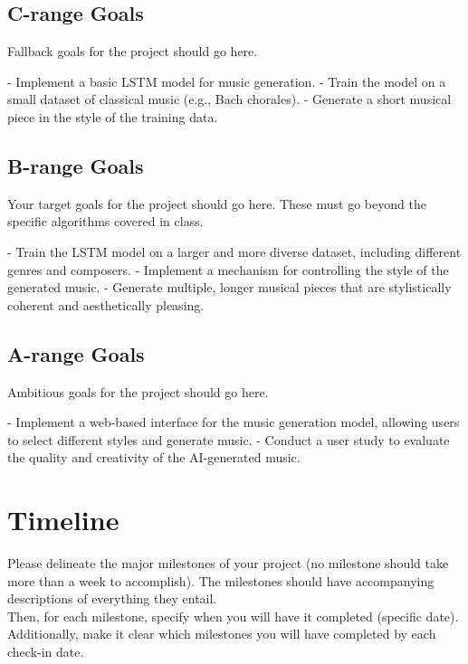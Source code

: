 \documentclass[]{article}
\begin{document}
\subsection{C-range Goals}

Fallback goals for the project should go here.

- Implement a basic LSTM model for music generation.
- Train the model on a small dataset of classical music (e.g., Bach chorales).
- Generate a short musical piece in the style of the training data.

\subsection{B-range Goals}

Your target goals for the project should go here. These must go beyond the specific algorithms covered in class.

- Train the LSTM model on a larger and more diverse dataset, including different genres and composers.
- Implement a mechanism for controlling the style of the generated music.
- Generate multiple, longer musical pieces that are stylistically coherent and aesthetically pleasing.

\subsection{A-range Goals}

Ambitious goals for the project should go here.

- Implement a web-based interface for the music generation model, allowing users to select different styles and generate music.
- Conduct a user study to evaluate the quality and creativity of the AI-generated music.


\section*{Timeline}
Please delineate the major milestones of your project (no milestone should take more than a week to accomplish). The milestones should have accompanying descriptions of everything they entail.\\

Then, for each milestone, specify when you will have it completed (specific date). Additionally, make it clear which milestones you will have completed by each check-in date.
\end{document}
